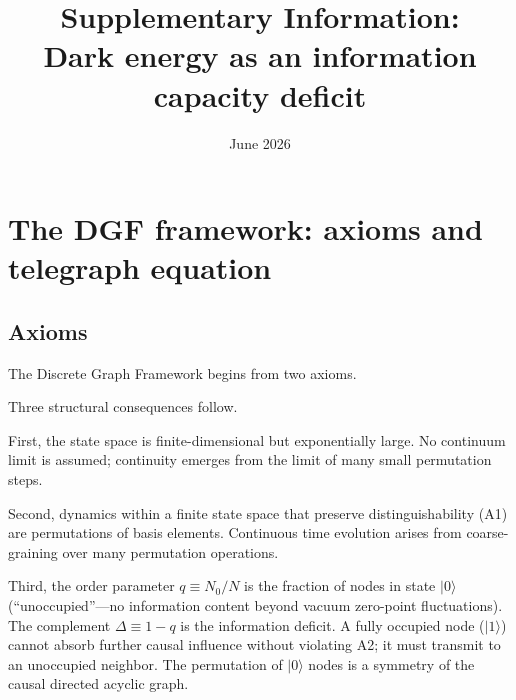 \documentclass[12pt,a4paper]{article}
\title{\bf Supplementary Information:\\
Dark energy as an information capacity deficit}
\date{June 2026}
\begin{document}
\maketitle
\tableofcontents

\section{The DGF framework: axioms and telegraph equation}

\subsection{Axioms}

The Discrete Graph Framework begins from two axioms.

\vspace{4pt}
\noindent{}

\vspace{4pt}
\noindent Three structural consequences follow.

First, the state space is finite-dimensional but exponentially large. No continuum limit is assumed; continuity emerges from the limit of many small permutation steps.

Second, dynamics within a finite state space that preserve distinguishability (A1) are permutations of basis elements. Continuous time evolution arises from coarse-graining over many permutation operations.

Third, the order parameter $q\equiv N_0/N$ is the fraction of nodes in state $|0\rangle$ (``unoccupied''---no information content beyond vacuum zero-point fluctuations). The complement $\Delta\equiv 1-q$ is the information deficit. A fully occupied node ($|1\rangle$) cannot absorb further causal influence without violating A2; it must transmit to an unoccupied neighbor. The permutation of $|0\rangle$ nodes is a symmetry of the causal directed acyclic graph.
\end{document}
